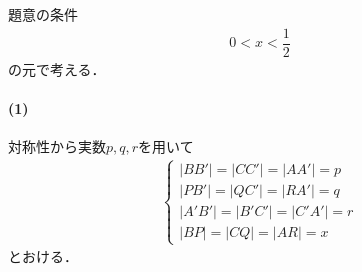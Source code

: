 \documentclass[../../main.tex]{subfiles}
\begin{document}
題意の条件
\begin{align}
  0 < x < \dfrac{1}{2} \label{eq:1}
\end{align}
の元で考える．

\paragraph{(1)}

対称性から実数$p,q,r$を用いて
\begin{align}
  \begin{cases}
    |BB'| = |CC'| = |AA'| = p \\
    |PB'| = |QC'| = |RA'| = q \\
    |A'B'| = |B'C'| = |C'A'| = r \\
    |BP | = |CQ|  = |AR|  = x
  \end{cases}\label{eq:2}
\end{align}
とおける．
\end{document}
